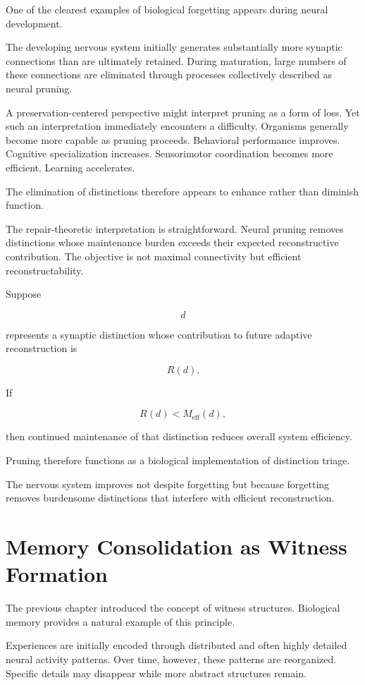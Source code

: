 \documentclass[12pt,oneside]{book}
\theoremstyle{plain} \newtheorem{theorem}{Theorem}[chapter] \newtheorem{lemma}[theorem]{Lemma} \newtheorem{proposition}[theorem]{Proposition} \newtheorem{corollary}[theorem]{Corollary}
\theoremstyle{definition} \newtheorem{definition}[theorem]{Definition} \newtheorem{axiom}[theorem]{Axiom} \newtheorem{construction}[theorem]{Construction}
\theoremstyle{remark} \newtheorem{remark}[theorem]{Remark} \newtheorem{example}[theorem]{Example}
\begin{document}
One of the clearest examples of biological forgetting appears during neural development.

The developing nervous system initially generates substantially more synaptic connections than are ultimately retained. During maturation, large numbers of these connections are eliminated through processes collectively described as neural pruning.

A preservation-centered perspective might interpret pruning as a form of loss. Yet such an interpretation immediately encounters a difficulty. Organisms generally become more capable as pruning proceeds. Behavioral performance improves. Cognitive specialization increases. Sensorimotor coordination becomes more efficient. Learning accelerates.

The elimination of distinctions therefore appears to enhance rather than diminish function.

The repair-theoretic interpretation is straightforward. Neural pruning removes distinctions whose maintenance burden exceeds their expected reconstructive contribution. The objective is not maximal connectivity but efficient reconstructability.

Suppose

\[
d
\]

represents a synaptic distinction whose contribution to future adaptive reconstruction is

\[
R(d).
\]

If

\[
R(d)
<
M_{\mathrm{eff}}(d),
\]

then continued maintenance of that distinction reduces overall system efficiency.

Pruning therefore functions as a biological implementation of distinction triage.

The nervous system improves not despite forgetting but because forgetting removes burdensome distinctions that interfere with efficient reconstruction.

\section{Memory Consolidation as Witness Formation}

The previous chapter introduced the concept of witness structures. Biological memory provides a natural example of this principle.

Experiences are initially encoded through distributed and often highly detailed neural activity patterns. Over time, however, these patterns are reorganized. Specific details may disappear while more abstract structures remain.
\end{document}
